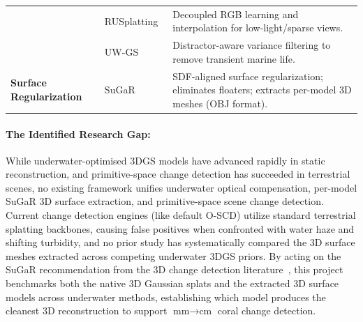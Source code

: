 \begin{table}[htbp]
\begin{tabularx}{\textwidth}{l l X}
        & RUSplatting~\cite{jiang2025rusplattingrobust3dgaussian} & Decoupled RGB learning and interpolation for low-light/sparse views. \\
        & UW-GS~\cite{10943785} & Distractor-aware variance filtering to remove transient marine life. \\
        \midrule
        \textbf{Surface Regularization} 
        & SuGaR~\cite{guedon2024sugar} & SDF-aligned surface regularization; eliminates floaters; extracts per-model 3D meshes (OBJ format). \\
        \bottomrule
    \end{tabularx}
\end{table}

\paragraph{The Identified Research Gap:} While underwater-optimised 3DGS models have advanced rapidly in static reconstruction, and primitive-space change detection has succeeded in terrestrial scenes, no existing framework unifies underwater optical compensation, per-model SuGaR 3D surface extraction, and primitive-space scene change detection. Current change detection engines (like default O-SCD) utilize standard terrestrial splatting backbones, causing false positives when confronted with water haze and shifting turbidity, and no prior study has systematically compared the 3D surface meshes extracted across competing underwater 3DGS priors. By acting on the SuGaR recommendation from the 3D change detection literature~\cite{galappaththige2026pixelsprimitivesscenechange}, this project benchmarks both the native 3D Gaussian splats and the extracted 3D surface models across underwater methods, establishing which model produces the cleanest 3D reconstruction to support $\text{mm} \to \text{cm}$ coral change detection.
